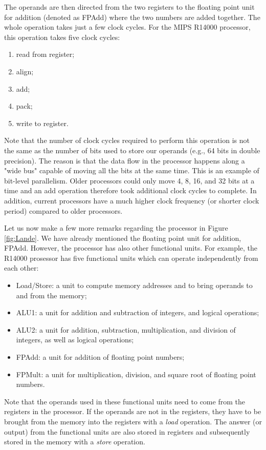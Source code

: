 \documentclass[11pt]{article}
\begin{document}
The operands are then directed from the two registers 
to the floating point unit for addition (denoted as FPAdd) where 
the two numbers are added together. The whole operation takes just a few clock 
cycles. For the MIPS R14000 processor, 
this operation takes five clock cycles: 
\begin{enumerate}
\item read from register; 
\item align;
\item add; 
\item pack;
\item write to register.
\end{enumerate}

Note that the number of clock cycles required to perform this operation is
not the same as the number of bits used to store our operands 
(e.g., 64 bits in double precision). The reason is that the data flow in the 
processor happens along a "wide bus" capable of moving all the bits 
at the same time. This is an example of bit-level parallelism. 
Older processors could only move 4, 8, 16, and 32 bits at a time
and an add operation therefore took additional clock cycles to complete. 
In addition, current processors have a much higher clock frequency
(or shorter clock period) compared to older processors. 

Let us now make a few more remarks regarding the processor in Figure \ref{fig:Lande}.
We have already mentioned the floating point unit for addition, FPAdd. 
However, the processor has also other functional units. 
For example, the R14000 prosessor has five functional units 
which can operate independently from each other: 

\begin{itemize}
\item Load/Store: a unit to compute memory addresses and to bring operands to and 
from the memory; 
\item ALU1: a unit for addition and subtraction of integers, and logical operations; 
\item ALU2: a unit for addition, subtraction, multiplication, and division of integers, 
as well as logical operations; 
\item FPAdd: a unit for addition of floating point numbers; 
\item FPMult: a unit for multiplication, division, and square root of floating point numbers. 
\end{itemize}
Note that the operands used in these functional units need to come from the 
registers in the processor. If the operands are not in the registers, they have to 
be brought from the memory into the registers with a {\em load} operation. 
The answer (or output) from the functional units are also stored in registers
and subsequently stored in the memory with a {\em store} operation. 
\end{document}
